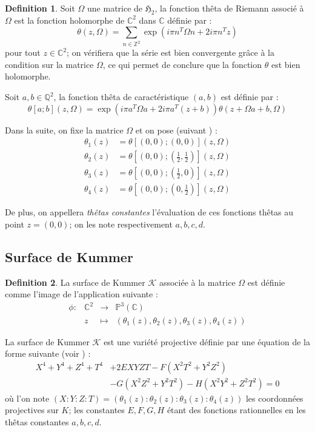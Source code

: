 \documentclass[a4paper]{article}
\theoremstyle{definition}
\newtheorem{definition}{Definition}[section]
\theoremstyle{remark}
\numberwithin{equation}{section}
\begin{document}
\begin{definition}
Soit $\Omega$ une matrice de $\mathfrak{H}_2$, la fonction thêta de Riemann associé à $\Omega$ est la fonction holomorphe de $\mathbb{C}^2$ dans $\mathbb{C}$ définie par :
$$\theta(z,\Omega) = \sum_{n \in \mathbb{Z}^2}{\exp(i\pi n^T \Omega n + 2i\pi n^T z)}$$
pour tout $z \in \mathbb{C}^2$; on vérifiera que la série est bien convergente grâce à la condition sur la matrice $\Omega$, ce qui permet de conclure que la fonction $\theta$ est bien holomorphe.

Soit $a,b \in \mathbb{Q}^2$, la fonction thêta de caractéristique $(a,b)$ est définie par :
$$\theta[a;b](z,\Omega) = \exp(i\pi a^T\Omega a + 2i\pi a^T(z+b))\theta(z + \Omega a + b, \Omega)$$
\end{definition}

Dans la suite, on fixe la matrice $\Omega$ et on pose (suivant \citet{gaudry}) :
\begin{align*}
\theta_1(z) &= \theta[(0,0);(0,0)](z,\Omega) \\
\theta_2(z) &= \theta[(0,0);(\frac{1}{2},\frac{1}{2})](z,\Omega) \\
\theta_3(z) &= \theta[(0,0);(\frac{1}{2},0)](z,\Omega) \\
\theta_4(z) &= \theta[(0,0);(0,\frac{1}{2})](z,\Omega)
\end{align*}

De plus, on appellera \emph{thêtas constantes} l'évaluation de ces fonctions thêtas au point $z=(0,0)$; on les note respectivement $a,b,c,d$.

\subsection{Surface de Kummer}

\begin{definition}
La surface de Kummer $\mathcal{K}$ associée à la matrice $\Omega$ est définie comme l'image de l'application suivante :
\begin{equation*}
\begin{array}{lrcl}
\phi :&\mathbb{C}^2 & \longrightarrow & \mathbb{P}^3(\mathbb{C}) \\
& z & \longmapsto & (\theta_1(z),\theta_2(z),\theta_3(z),\theta_4(z))
\end{array}
\end{equation*}
\end{definition}

La surface de Kummer $\mathcal{K}$ est une variété projective définie par une équation de la forme suivante (voir \citet{gaudry}) :
\begin{align*}
X^4+Y^4+Z^4+T^4&+2EXYZT-F(X^2T^2+Y^2Z^2) \\
&-G(X^2Z^2+Y^2T^2)-H(X^2Y^2+Z^2T^2)=0
\end{align*}
où l'on note $(X:Y:Z:T)=(\theta_1(z):\theta_2(z):\theta_3(z):\theta_4(z))$ les coordonnées projectives sur $K$; les constantes $E,F,G,H$ étant des fonctions rationnelles en les thêtas constantes $a,b,c,d$.
\end{document}
